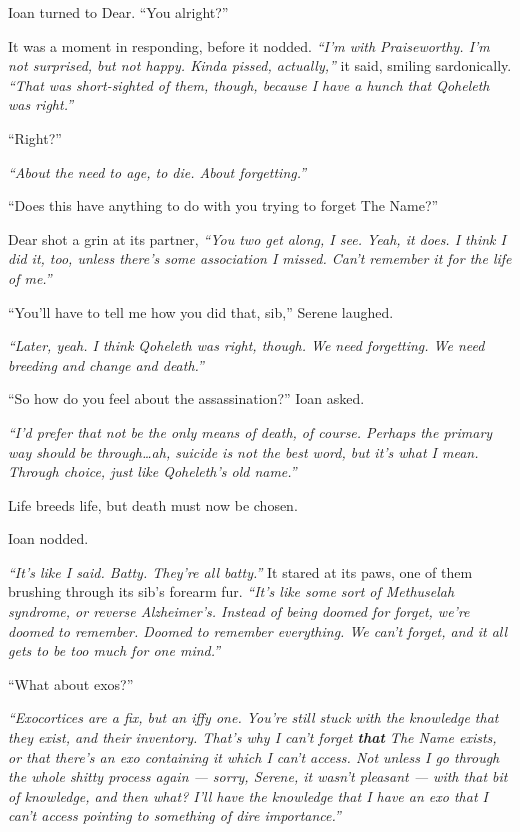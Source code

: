 Ioan turned to Dear. ``You alright?''

It was a moment in responding, before it nodded. \emph{``I'm with Praiseworthy. I'm not surprised, but not happy. Kinda pissed, actually,''} it said, smiling sardonically. \emph{``That was short-sighted of them, though, because I have a hunch that Qoheleth was right.''}

``Right?''

\emph{``About the need to age, to die. About forgetting.''}

``Does this have anything to do with you trying to forget The Name?''

Dear shot a grin at its partner, \emph{``You two get along, I see. Yeah, it does. I think I did it, too, unless there's some association I missed. Can't remember it for the life of me.''}

``You'll have to tell me how you did that, sib,'' Serene laughed.

\emph{``Later, yeah. I think Qoheleth was right, though. We need forgetting. We need breeding and change and death.''}

``So how do you feel about the assassination?'' Ioan asked.

\emph{``I'd prefer that not be the only means of death, of course. Perhaps the primary way should be through\ldots{}ah, suicide is not the best word, but it's what I mean. Through choice, just like Qoheleth's old name.''}

Life breeds life, but death must now be chosen.

Ioan nodded.

\emph{``It's like I said. Batty. They're all batty.''} It stared at its paws, one of them brushing through its sib's forearm fur. \emph{``It's like some sort of Methuselah syndrome, or reverse Alzheimer's. Instead of being doomed for forget, we're doomed to remember. Doomed to remember everything. We can't forget, and it all gets to be too much for one mind.''}

``What about exos?''

\emph{``Exocortices are a fix, but an iffy one. You're still stuck with the knowledge that they exist, and their inventory. That's why I can't forget \textbf{that} The Name exists, or that there's an exo containing it which I can't access. Not unless I go through the whole shitty process again — sorry, Serene, it wasn't pleasant — with that bit of knowledge, and then what? I'll have the knowledge that I have an exo that I can't access pointing to something of dire importance.''}

